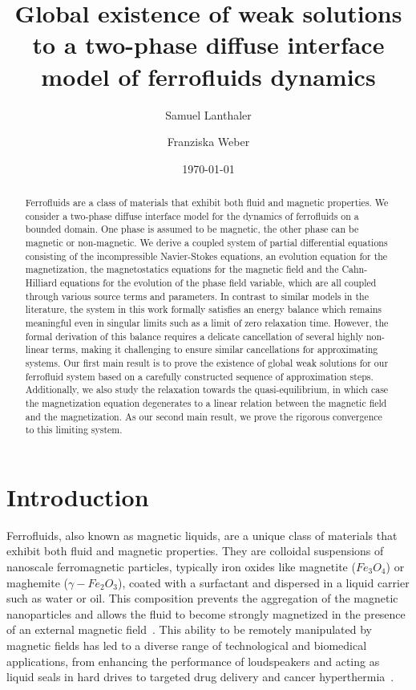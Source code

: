 \documentclass[10pt,letterpaper,twoside]{amsart}
\title[Multiphase flow ferrofluids]{Global existence of weak solutions to a two-phase diffuse interface model of  ferrofluids dynamics}
\author[S. Lanthaler]{Samuel Lanthaler}
\author[F. Weber]{Franziska Weber}
\date{\today}
\theoremstyle{definition}{\newtheorem{definition}[lemma]{Definition}}
\theoremstyle{note}{\newtheorem{claim}{Claim}[section]
\newtheorem*{claim*}{Claim}}
\numberwithin{equation}{section}
\begin{document}
\maketitle
\begin{abstract}
   Ferrofluids are a class of materials that exhibit both fluid and magnetic properties. We consider a two-phase diffuse interface model for the dynamics of ferrofluids on a bounded domain. One phase is assumed to be magnetic, the other phase can be magnetic or non-magnetic. We derive a coupled system of partial differential equations consisting of the incompressible Navier-Stokes equations, an evolution equation for the magnetization, the magnetostatics equations for the magnetic field and the Cahn-Hilliard equations for the evolution of the phase field variable, which are all coupled through various source terms and parameters. In contrast to similar models in the literature, the system in this work formally satisfies an energy balance which remains meaningful even in singular limits such as a limit of zero relaxation time. However, the formal derivation of this balance requires a delicate cancellation of several highly non-linear terms, making it challenging to ensure similar cancellations for approximating systems. Our first main result is to prove the existence of global weak solutions for our ferrofluid system based on a carefully constructed sequence of approximation steps. Additionally, we also study the relaxation towards the quasi-equilibrium, in which case the magnetization equation degenerates to a linear relation between the magnetic field and the magnetization. As our second main result, we prove the rigorous convergence to this limiting system.
  
\end{abstract}



\section{Introduction}
 Ferrofluids, also known as magnetic liquids, are a unique class of materials that exhibit both fluid and magnetic properties. They are colloidal suspensions of nanoscale ferromagnetic particles, typically iron oxides like magnetite ($Fe_3O_4$) or maghemite ($\gamma-Fe_2 O_3$), coated with a surfactant and dispersed in a liquid carrier such as water or oil. This composition prevents the aggregation of the magnetic nanoparticles and allows the fluid to become strongly magnetized in the presence of an external magnetic field~\cite{Oehlsen2022,Odenbach2002}. This ability to be remotely manipulated by magnetic fields has led to a diverse range of technological and biomedical applications, from enhancing the performance of loudspeakers and acting as liquid seals in hard drives to targeted drug delivery and cancer hyperthermia~\cite{AmiriRoodan2020,Raj1995,Scherer2005,Pankhurst2003}.
 
\end{document}

